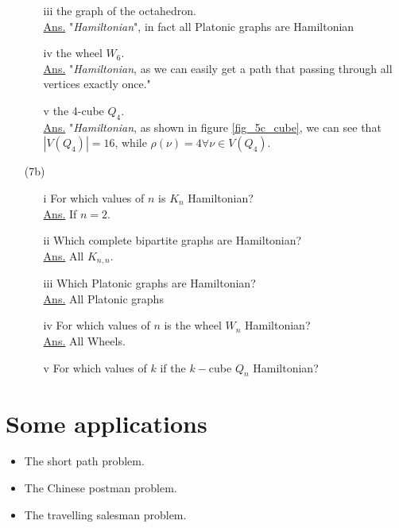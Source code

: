\documentclass[12pt,a4paper, twocolumn]{article}
\begin{document}
\begin{itemize}
{\begin{itemize}
\begin{figure}[h!]
					\caption{$K_{5,3}$}		
					\label{fig_7_1}
				\end{figure}
				\item[iii] the graph of the octahedron.\\ {\color{black} \underline{Ans.} "\emph{Hamiltonian}", in fact all Platonic graphs are Hamiltonian} 
				\item[iv] the wheel $W_6$.\\ {\color{black} \underline{Ans.} "\emph{Hamiltonian}, as we can easily get a path that passing through all vertices exactly once."} 
				\item[v] the 4-cube $Q_4$.\\ {\color{black} \underline{Ans.} "\emph{Hamiltonian}, as shown in figure \ref{fig_5c_cube}, we can see that $|V(Q_4)| = 16$, while $\rho(\nu) = 4 \forall \nu \in V(Q_4)$}. 
			\end{itemize}
			}
			\hsplit
	\item[(7b)] {\color{blue}
			\begin{itemize}
				\item[i] For which values of $n$ is $K_n$ Hamiltonian? \\ {\color{black} \underline{Ans.} If $n=2$.}
				\item[ii] Which complete bipartite graphs are Hamiltonian?\\ {\color{black} \underline{Ans.} All $K_{n,n}$.} 
				\item[iii] Which Platonic graphs are Hamiltonian?\\ {\color{black} \underline{Ans.} All Platonic graphs} 
				\item[iv] For which values of $n$ is the wheel $W_n$ Hamiltonian?\\ {\color{black} \underline{Ans.} All Wheels.} 

				\item[v] For which values of $k$ if the $k-$cube $Q_n$ Hamiltonian?
			\end{itemize}	
			}
\end{itemize}

\section*{Some applications}
\begin{itemize}
		\item The short path problem.
		\item The Chinese postman problem.
		\item The travelling salesman problem.
\end{itemize}
\end{document}
